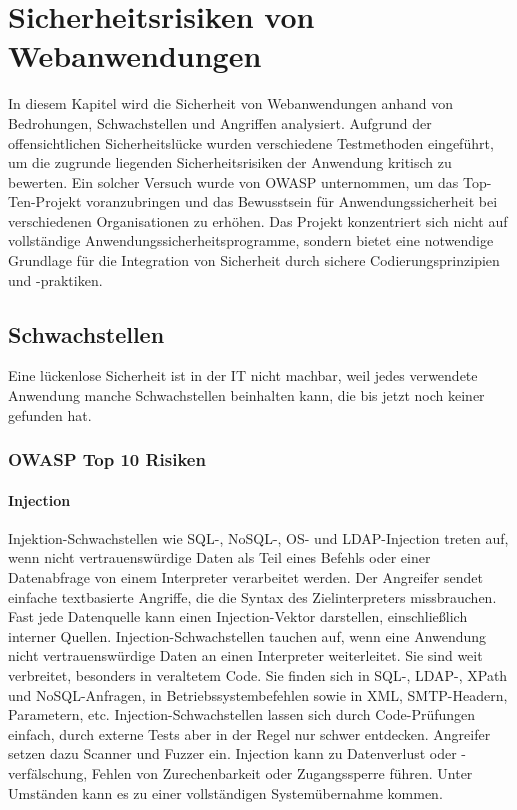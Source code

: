 \chapter{Sicherheitsrisiken von Webanwendungen}
\label{chap:k3}

In diesem Kapitel wird die Sicherheit von Webanwendungen anhand von Bedrohungen, Schwachstellen und Angriffen analysiert. Aufgrund der offensichtlichen Sicherheitslücke wurden verschiedene Testmethoden eingeführt, um die zugrunde liegenden Sicherheitsrisiken der Anwendung kritisch zu bewerten. Ein solcher Versuch wurde von OWASP unternommen, um das Top-Ten-Projekt voranzubringen und das Bewusstsein für Anwendungssicherheit bei verschiedenen Organisationen zu erhöhen. Das Projekt konzentriert sich nicht auf vollständige Anwendungssicherheitsprogramme, sondern bietet eine notwendige Grundlage für die Integration von Sicherheit durch sichere Codierungsprinzipien und -praktiken.

\section{Schwachstellen}

Eine lückenlose Sicherheit ist in der IT nicht machbar, weil jedes verwendete Anwendung manche Schwachstellen beinhalten kann, die bis jetzt noch keiner gefunden hat.

\subsection{OWASP Top 10 Risiken}

\subsubsection{Injection}

Injektion-Schwachstellen wie SQL-, NoSQL-, OS- und LDAP-Injection treten auf,  wenn nicht vertrauenswürdige Daten als Teil eines Befehls oder einer Datenabfrage von einem Interpreter verarbeitet werden\cite[6]{owasp17top10}. Der Angreifer sendet einfache textbasierte Angriffe, die die Syntax des Zielinterpreters missbrauchen. Fast jede Datenquelle kann einen Injection-Vektor darstellen, einschließlich interner Quellen. Injection-Schwachstellen tauchen auf, wenn eine Anwendung nicht vertrauenswürdige Daten an einen Interpreter weiterleitet. Sie sind weit verbreitet, besonders in veraltetem Code. Sie finden sich in SQL-, LDAP-, XPath und NoSQL-Anfragen, in Betriebssystembefehlen sowie in XML, SMTP-Headern, Parametern, etc. Injection-Schwachstellen lassen sich durch Code-Prüfungen einfach, durch externe Tests aber in der Regel nur schwer entdecken. Angreifer setzen dazu Scanner und Fuzzer ein. Injection kann zu Datenverlust oder -verfälschung, Fehlen von Zurechenbarkeit oder Zugangssperre führen. Unter Umständen kann es zu einer vollständigen Systemübernahme kommen\cite[7]{owasp17top10}.\\

